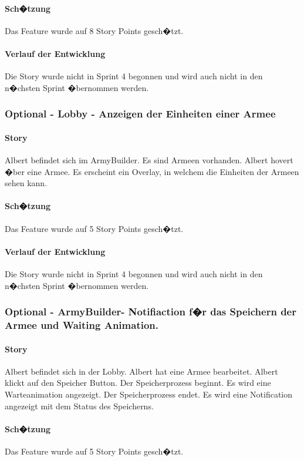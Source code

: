 \documentclass[12pt, titlepage]{scrartcl}
\begin{document}
			\paragraph{Sch�tzung}
			Das Feature wurde auf 8 Story Points gesch�tzt.
			\paragraph{Verlauf der Entwicklung} 
			Die Story wurde nicht in Sprint 4 begonnen und wird auch nicht in den n�chsten Sprint �bernommen werden.
			\subsubsection{Optional - Lobby - Anzeigen der Einheiten einer Armee}
			\paragraph{Story} Albert befindet sich im ArmyBuilder. Es sind Armeen vorhanden. Albert hovert �ber eine Armee. Es erscheint ein Overlay, in welchem die Einheiten der Armeen sehen kann.
			\paragraph{Sch�tzung}
			Das Feature wurde auf 5 Story Points gesch�tzt.
			\paragraph{Verlauf der Entwicklung} 
			Die Story wurde nicht in Sprint 4 begonnen und wird auch nicht in den n�chsten Sprint �bernommen werden.
			\subsubsection{Optional - ArmyBuilder- Notifiaction f�r das Speichern der Armee und Waiting Animation.}
			\paragraph{Story} Albert befindet sich in der Lobby. Albert hat eine Armee bearbeitet. Albert klickt auf den Speicher Button. Der Speicherprozess beginnt. Es wird eine Warteanimation angezeigt. Der Speicherprozess endet. Es wird eine Notification angezeigt mit dem Status des Speicherns.
			\paragraph{Sch�tzung}
			Das Feature wurde auf 5 Story Points gesch�tzt.
\end{document}
